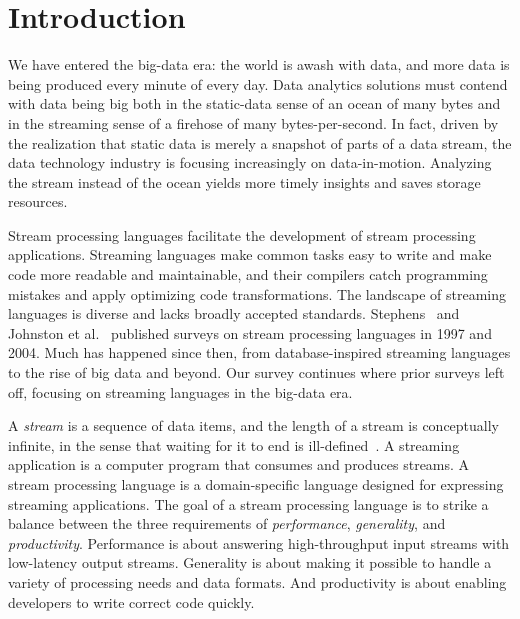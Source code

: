 \section{Introduction}\label{sec:introduction}

We have entered the big-data era: the world is awash with data, and
more data is being produced every minute of every day. Data analytics
solutions must contend with data being big both in the static-data sense of
an ocean of many bytes and in the streaming sense of a firehose of
many bytes-per-second. In fact, driven by the realization that static
data is merely a snapshot of parts of a data stream, the data technology
industry is focusing increasingly on data-in-motion. Analyzing
the stream instead of the ocean yields more timely insights and saves
storage resources.

Stream processing languages facilitate the development of stream
processing applications. Streaming languages make common tasks easy to
write and make code more readable and maintainable, and their
compilers catch programming mistakes and apply optimizing code
transformations. The landscape of streaming languages is diverse and
lacks broadly accepted standards.  Stephens~\cite{stephens_1997} and
Johnston et al.~\cite{johnston_hanna_millar_2004} published surveys on
stream processing languages in 1997 and 2004. Much has happened since
then, from database-inspired streaming languages to the rise of big
data and beyond. Our survey continues where prior surveys left off,
focusing on streaming languages in the big-data era.

A \emph{stream} is a sequence of data items, and the length of a
stream is conceptually infinite, in the sense that waiting for it to
end is ill-defined~\cite{muthukrishnan2005data}. A streaming application is a computer program that
consumes and produces streams. A stream processing language is a
domain-specific language designed for expressing streaming
applications. The goal of a stream processing language is to strike a
balance between the three requirements of \emph{performance}, \emph{generality}, and
\emph{productivity}. Performance is about answering high-throughput input
streams with low-latency output streams. Generality is about making it
possible to handle a variety of processing needs and data formats. And
productivity is about enabling developers to write correct code
quickly.

